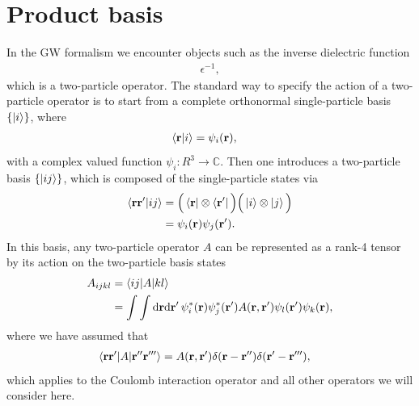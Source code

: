 \documentclass[12pt,a4paper]{scrartcl}
\numberwithin{equation}{section}
\renewcommand{\vec}{\mathbf}
\begin{document}
 

\section{Product basis}
\label{sec:product_basis}

In the GW formalism we encounter objects such as the inverse dielectric function
\begin{align}
 \epsilon^{-1},
\end{align}
which is a two-particle operator. The standard way to specify the action of a two-particle operator
is to start from a complete orthonormal single-particle basis $\{ \ket{i} \}$, where
\begin{align}
 \braket{\vec{r} | i} &= \psi_i(\vec{r}),
\end{align}
with a complex valued function $\psi_i: R^3\rightarrow \mathbb{C}$.
Then one introduces a two-particle basis $\{ \ket{ij} \}$, which is composed of the single-particle states via
\begin{align}
\braket{\vec{r}\vec{r}' | ij} 
&= \Big( \bra{\vec{r}} \otimes \bra{\vec{r}'} \Big) \Big( \ket{i} \otimes \ket{j} \Big) \\
&= \psi_i(\vec{r})\psi_j(\vec{r}').
\end{align}
In this basis, any two-particle operator $A$ can be represented as a rank-4 tensor
by its action on the two-particle basis states
\begin{align}
A_{ijkl} &= \braket{ij | A | kl }  \\
&= \int \int \mathrm{d}\vec{r}\mathrm{d}\vec{r}' \, \psi^*_i(\vec{r})\psi^*_j(\vec{r}') 
                                          A(\vec{r},\vec{r}') \psi_l(\vec{r}')\psi_k(\vec{r}),
\end{align}
where we have assumed that 
\begin{align}
 \braket{\vec{r}\vec{r}' | A | \vec{r}''\vec{r}''' }
 &= A(\vec{r},\vec{r}') \delta(\vec{r}-\vec{r}'') \delta(\vec{r}'-\vec{r}'''),
\end{align}
which applies to the Coulomb interaction operator and all other operators we will consider here.
\end{document}
